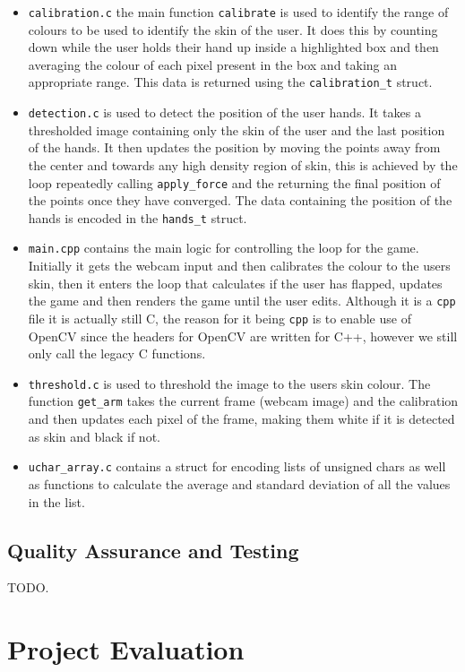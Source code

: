 \documentclass[10pt]{article}
\begin{document}
\begin{itemize}
\item \texttt{calibration.c} the main function \texttt{calibrate} is used to identify the range of colours to be used to identify the skin of the user. It does this by counting down while the user holds their hand up inside a highlighted box and then averaging the colour of each pixel present in the box and taking an appropriate range. This data is returned using the \texttt{calibration\_t} struct.
\item \texttt{detection.c} is used to detect the position of the user hands. It takes a thresholded image containing only the skin of the user and the last position of the hands. It then updates the position by moving the points away from the center and towards any high density region of skin, this is achieved by the loop repeatedly calling \texttt{apply\_force} and the returning the final position of the points once they have converged. The data containing the position of the hands is encoded in the \texttt{hands\_t} struct.
\item \texttt{main.cpp} contains the main logic for controlling the loop for the game. Initially it gets the webcam input and then calibrates the colour to the users skin, then it enters the loop that calculates if the user has flapped, updates the game and then renders the game until the user edits. Although it is a \texttt{cpp} file it is actually still C, the reason for it being \texttt{cpp} is to enable use of OpenCV since the headers for OpenCV are written for C++, however we still only call the legacy C functions.
\item \texttt{threshold.c} is used to threshold the image to the users skin colour. The function \texttt{get\_arm} takes the current frame (webcam image) and the calibration and then updates each pixel of the frame, making them white if it is detected as skin and black if not.
\item \texttt{uchar\_array.c} contains a struct for encoding lists of unsigned chars as well as functions to calculate the average and standard deviation of all the values in the list.
\end{itemize}

\subsection{Quality Assurance and Testing}

TODO.

\section{Project Evaluation}
\end{document}
